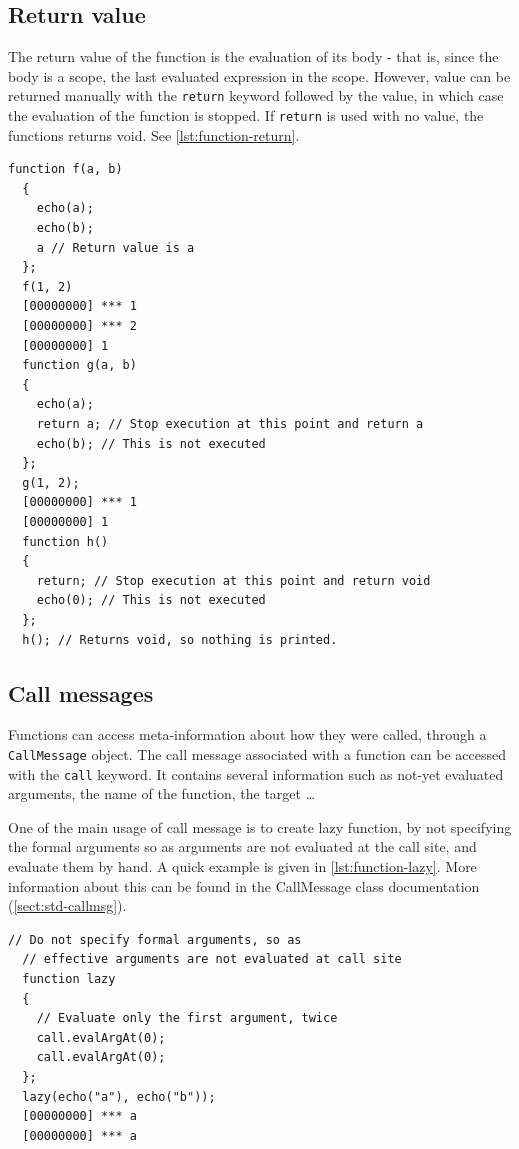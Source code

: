 \documentclass[openright,twoside,12pt]{report}
\newcommand   {\floatpos}          {htbp}
\newcommand   {\floatposh}         {!htb}
\newcommand{\lst}[1]{\autoref{lst:#1}}
\newcommand{\sect}[1]{\autoref{sect:#1}}
\begin{document}
\subsection{Return value}

The return value of the function is the evaluation of its body - that
is, since the body is a scope, the last evaluated expression in the
scope. However, value can be returned manually with the
\lstinline|return| keyword followed by the value, in which case the
evaluation of the function is stopped. If \lstinline|return| is used
with no value, the functions returns void. See \lst{function-return}.

\begin{lstlisting}[caption=Returning values from functions,
  label=lst:function-return,float=\floatpos]
  function f(a, b)
  {
    echo(a);
    echo(b);
    a // Return value is a
  };
  f(1, 2)
  [00000000] *** 1
  [00000000] *** 2
  [00000000] 1
  function g(a, b)
  {
    echo(a);
    return a; // Stop execution at this point and return a
    echo(b); // This is not executed
  };
  g(1, 2);
  [00000000] *** 1
  [00000000] 1
  function h()
  {
    return; // Stop execution at this point and return void
    echo(0); // This is not executed
  };
  h(); // Returns void, so nothing is printed.
\end{lstlisting}

\subsection{Call messages}
\label{sect:us-fun-callmsg}

Functions can access meta-information about how they were called,
through a \lstinline|CallMessage| object. The call message associated
with a function can be accessed with the \lstinline|call| keyword. It
contains several information such as not-yet evaluated arguments, the
name of the function, the target \ldots

One of the main usage of call message is to create lazy function, by
not specifying the formal arguments so as arguments are not evaluated
at the call site, and evaluate them by hand. A quick example is given
in \lst{function-lazy}. More information about this can be found in
the CallMessage class documentation (\sect{std-callmsg}).

\begin{lstlisting}[caption=Lazy
  function,label=lst:function-lazy,float=\floatposh]
  // Do not specify formal arguments, so as
  // effective arguments are not evaluated at call site
  function lazy
  {
    // Evaluate only the first argument, twice
    call.evalArgAt(0);
    call.evalArgAt(0);
  };
  lazy(echo("a"), echo("b"));
  [00000000] *** a
  [00000000] *** a
\end{lstlisting}
\end{document}
